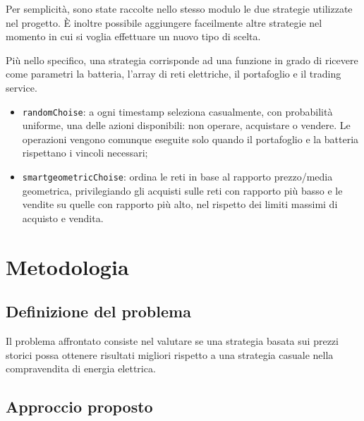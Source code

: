 \documentclass[12pt,a4paper,oneside]{report}
\begin{document}
Per semplicità, sono state raccolte nello stesso modulo le due strategie 
utilizzate nel progetto. È inoltre possibile aggiungere faceilmente altre 
strategie nel momento in cui si voglia effettuare un nuovo tipo di scelta.

Più nello specifico, una strategia corrisponde ad una funzione in grado di 
ricevere come parametri la batteria, l'array di reti elettriche, il portafoglio 
e il trading service.

\begin{itemize}
    \item \texttt{randomChoise}: a ogni timestamp seleziona casualmente, 
    con probabilità uniforme, una delle azioni disponibili: non operare, 
    acquistare o vendere. Le operazioni vengono comunque eseguite solo 
    quando il portafoglio e la batteria rispettano i vincoli necessari;

    \item \texttt{smartgeometricChoise}: ordina le reti in base al rapporto 
    prezzo/media geometrica, privilegiando gli acquisti sulle reti con 
    rapporto più basso e le vendite su quelle con rapporto più alto, 
    nel rispetto dei limiti massimi di acquisto e vendita.
\end{itemize}

\chapter{Metodologia}
\label{chap:methods}


\section{Definizione del problema}

Il problema affrontato consiste nel valutare se una strategia basata sui
prezzi storici possa ottenere risultati migliori rispetto a una strategia
casuale nella compravendita di energia elettrica.


\section{Approccio proposto}
\end{document}
